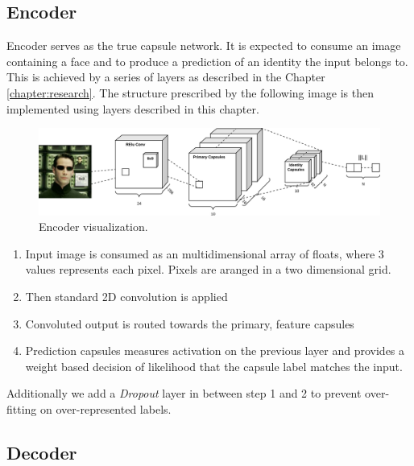 \subsection{Encoder}

Encoder serves as the true capsule network. It is expected to consume an image containing a face and to produce a prediction of an identity the input belongs to. This is achieved by a series of layers as described in the Chapter\,\ref{chapter:research}. The structure prescribed by the following image is then implemented using layers described in this chapter.

\begin{figure}[ht!]
    \centering
    \includegraphics[width=\textwidth]{obrazky-figures/my_capsnet_encoder.pdf}
    \caption{Encoder visualization.}
    \label{fig:my_encoder}
\end{figure}

\begin{enumerate}
    \item Input image is consumed as an multidimensional array of floats, where 3 values represents each pixel. Pixels are aranged in a two dimensional grid.
    \item Then standard 2D convolution is applied
    \item Convoluted output is routed towards the primary, feature capsules
    \item Prediction capsules measures activation on the previous layer and provides a weight based decision of likelihood that the capsule label matches the input.
\end{enumerate}

Additionally we add a \textit{Dropout} layer in between step 1 and 2 to prevent over-fitting on over-represented labels.

\subsection{Decoder}

